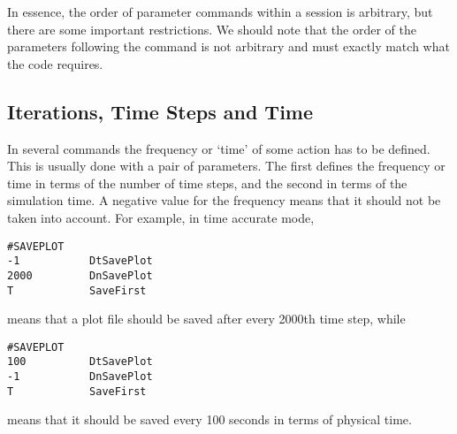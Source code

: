 In essence, the order of parameter commands within a
session is arbitrary, but there are some important restrictions.  
We should note that the order of the parameters following 
the command is not arbitrary and must exactly match what the code requires.  

\subsection{Iterations, Time Steps and Time \label{section:frequency}}

In several commands the frequency or `time' of some action has
to be defined. This is usually done with a pair of parameters.
The first defines the frequency or time in terms of the number of time steps,
and the second in terms of the simulation time.
A negative value for the frequency means that it should not be taken 
into account. For example, in time accurate mode,
\begin{verbatim}
#SAVEPLOT                                                                                           
-1           DtSavePlot
2000         DnSavePlot
T            SaveFirst
\end{verbatim}
means that a plot file should be saved after every 2000th time step, while
\begin{verbatim}
#SAVEPLOT
100          DtSavePlot
-1           DnSavePlot
T            SaveFirst
\end{verbatim}
means that it should be saved every 100 seconds in terms of physical time.



